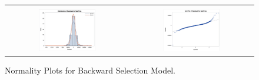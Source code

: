 \documentclass[11pt]{scrartcl} %
\begin{document}
\begin{figure}[H] %
	\centering
	\begin{tabular}{p{} p{}}
\hline	
	\multicolumn{1}{|c}{} &  \multicolumn{1}{c|}{} \\
		\multicolumn{1}{|c}{\includegraphics[width=0.48\textwidth]{../graphics/A2BWHist}} &
		\multicolumn{1}{c|}{\includegraphics[width=0.48\textwidth]{../graphics/A2BWqq}}\\
		\hline
	\end{tabular}		
	\caption{Normality Plots for Backward Selection Model.} %
	\label{fig:A2BWQQ}
\end{figure}
\end{document}
